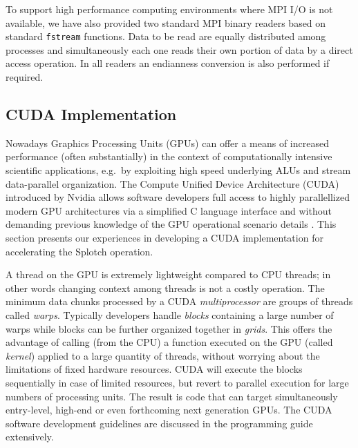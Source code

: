 \documentclass[1p,times]{elsarticle}
\begin{document}
To support high performance computing environments where MPI I/O is not available, 
we have also provided two standard MPI binary readers based on standard {\tt fstream} functions.
Data to be read are equally distributed among processes and simultaneously each one reads
their own portion of data by a direct access operation. 
%
In all readers an endianness conversion is also performed if required.



\subsection{CUDA Implementation}
\label{cuda}
Nowadays Graphics Processing Units (GPUs) can offer a means of increased performance 
(often substantially) in the context of computationally intensive scientific applications, 
e.g.\ by exploiting high speed underlying ALUs and stream data-parallel organization. 
The Compute Unified Device Architecture (CUDA) introduced by Nvidia allows software
developers full access to highly parallellized modern GPU architectures via a 
simplified C language interface and without demanding previous knowledge of the 
GPU operational scenario details \cite{cuda}. This section presents our experiences 
in developing a CUDA implementation for accelerating the Splotch operation.

A thread on the GPU is extremely lightweight compared to CPU threads; in other
words changing context among threads is not a costly operation. The minimum 
data chunks processed by a CUDA {\it multiprocessor} are groups of threads called 
{\it warps}. Typically developers handle {\it blocks} containing a large number 
of warps while blocks can be further organized together in {\it grids}. This 
offers the advantage of calling (from the CPU) a function executed on the GPU 
(called {\it kernel}) applied to a large quantity of threads, without worrying about 
the limitations of fixed hardware resources. CUDA will execute the blocks sequentially
in case of limited resources, but revert to parallel execution for large numbers 
of processing units.  The result is code that can target simultaneously
entry-level, high-end or even forthcoming next generation GPUs. The CUDA software 
development guidelines are discussed in the programming guide \cite{cudaprogguide} 
extensively.
\end{document}
